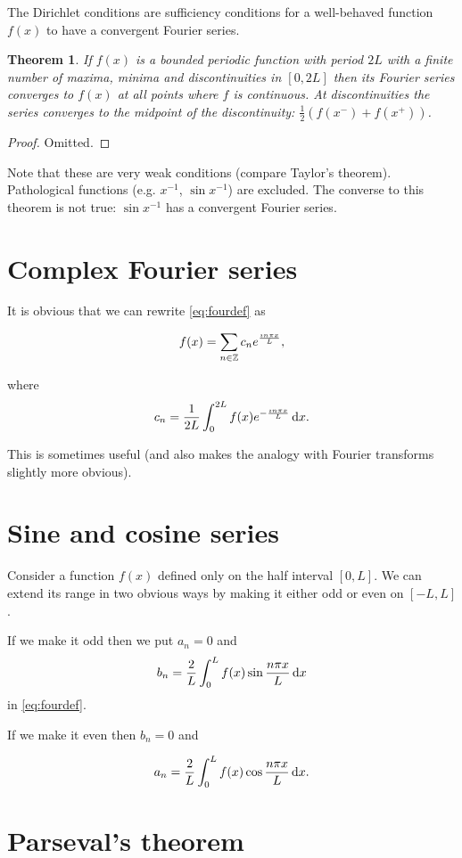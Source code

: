 \documentclass{notes}
\theoremstyle{plain}
\newtheorem{theorem}{Theorem}[chapter]
\begin{document}
The Dirichlet conditions are sufficiency conditions for a well-behaved
function $f(x)$ to have a convergent Fourier series.

\begin{theorem}
  If $f(x)$ is a bounded periodic function with period $2L$ with a
  finite number of maxima, minima and discontinuities in $[0,2L]$ then
  its Fourier series converges to $f(x)$ at all points where $f$ is
  continuous.  At discontinuities the series converges to the midpoint
  of the discontinuity: $\frac{1}{2} \left( f(x^-) + f(x^+)\right)$.
\end{theorem}

\begin{proof}
Omitted.
\end{proof}

Note that these are very weak conditions (compare Taylor's
theorem).  Pathological functions (e.g. $x^{-1}$, $\sin x^{-1}$) are
excluded.  The converse to this theorem is not true: $\sin
x^{-1}$ has a convergent Fourier series.

\section{Complex Fourier series}

It is obvious that we can rewrite \eqref{eq:fourdef} as

\[
f(x) = \sum_{n \in \mathbb{Z}} c_n e^{\frac{\imath n \pi x}{L}},
\]

where
\[
c_n = \frac{1}{2 L} \int_0^{2L} f(x) e^{-\frac{\imath n \pi x}{L}}\,
\mathrm{d} x.
\]

This is sometimes useful (and also makes the analogy with Fourier
transforms slightly more obvious).

\section{Sine and cosine series}

Consider a function $f(x)$ defined only on the half interval $[0,L]$.
We can extend its range in two obvious ways by making it either odd or
even on $[-L,L]$.

If we make it odd then we put $a_n = 0$ and
\[
b_n = \frac{2}{L} \int_0^L f(x) \sin \frac{n \pi x}{L}\, \mathrm{d} x
\]
in \eqref{eq:fourdef}.

If we make it even then $b_n = 0$ and

\[
a_n = \frac{2}{L} \int_0^L f(x) \cos \frac{n \pi x}{L}\, \mathrm{d} x.
\]

\section{Parseval's theorem}
\end{document}
